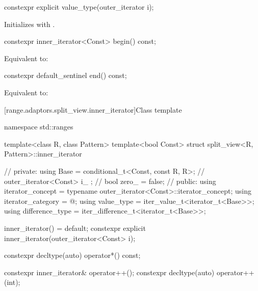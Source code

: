 \begin{addedblock}
%
\begin{itemdecl}
constexpr explicit value_type(outer_iterator i);
\end{itemdecl}

\begin{itemdescr}
\pnum
\effects Initializes  with .
\end{itemdescr}

%
\begin{itemdecl}
constexpr inner_iterator<Const> begin() const;
\end{itemdecl}

\begin{itemdescr}
\pnum
\effects Equivalent to: 
\end{itemdescr}

%
\begin{itemdecl}
constexpr default_sentinel end() const;
\end{itemdecl}

\begin{itemdescr}
\pnum
\effects Equivalent to: 
\end{itemdescr}

[range.adaptors.split_view.inner_iterator]{Class template }

\begin{codeblock}
namespace std::ranges {
  template<class R, class Pattern>
  template<bool Const>
  struct split_view<R, Pattern>::inner_iterator { // \expos
  private:
    using Base =
      conditional_t<Const, const R, R>; // \expos
    outer_iterator<Const> i_ {};        // \expos
    bool zero_ = false;                 // \expos
  public:
    using iterator_concept  = typename outer_iterator<Const>::iterator_concept;
    using iterator_category = @\seebelownc@;
    using value_type        = iter_value_t<iterator_t<Base>>;
    using difference_type   = iter_difference_t<iterator_t<Base>>;

    inner_iterator() = default;
    constexpr explicit inner_iterator(outer_iterator<Const> i);

    constexpr decltype(auto) operator*() const;

    constexpr inner_iterator& operator++();
    constexpr decltype(auto) operator++(int);

}}
\end{codeblock}
\end{addedblock}

